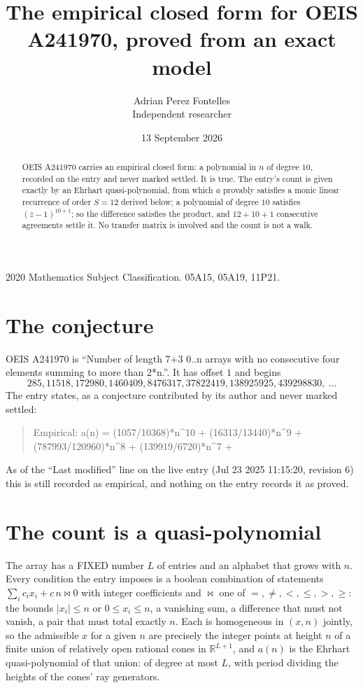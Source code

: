 \documentclass[11pt,a4paper]{article}
\title{The empirical closed form for OEIS A241970, proved from an exact model}
\author{Adrian Perez Fontelles\\ \small Independent researcher}
\date{13 September 2026}
\theoremstyle{plain}
\theoremstyle{definition}
\begin{document}
\maketitle

\begin{abstract}
OEIS A241970 carries an empirical closed form: a polynomial in $n$ of degree $10$, recorded on the
entry and never marked settled. It is true. The entry's count is given exactly by an Ehrhart
quasi-polynomial, from which $a$ provably satisfies a monic linear recurrence of order $S=12$
derived below; a polynomial of degree $10$ satisfies $(z-1)^{10+1}$; so the difference
satisfies the product, and $12+10+1$ consecutive agreements settle it. No transfer matrix is
involved and the count is not a walk.
\end{abstract}

\noindent\small 2020 Mathematics Subject Classification. 05A15, 05A19, 11P21.\normalsize

\section{The conjecture}

OEIS A241970 is ``Number of length 7+3 0..n arrays with no consecutive four elements summing to more than 2*n.''. It has offset $1$ and begins
\[
285, 11518, 172980, 1460409, 8476317, 37822419, 138925925, 439298830,\ \dots
\]
The entry states, as a conjecture contributed by its author and never marked settled:
\begin{quote}
Empirical: a(n) = (1057/10368)*n\^{}10 + (16313/13440)*n\^{}9 + (787993/120960)*n\^{}8 + (139919/6720)*n\^{}7 + 
\end{quote}
As of the ``Last modified'' line on the live entry (Jul 23 2025 11:15:20, revision 6)
this is still recorded as empirical, and nothing on the entry records it as proved.

\section{The count is a quasi-polynomial}

The array has a FIXED number $L$ of entries and an alphabet that grows with $n$. Every
condition the entry imposes is a boolean combination of statements
$\sum_i c_ix_i + c\,n \bowtie 0$ with integer coefficients and $\bowtie$ one of
$=,\ne,<,\le,>,\ge$: the bounds $|x_i|\le n$ or $0\le x_i\le n$, a vanishing sum, a difference
that must not vanish, a pair that must total exactly $n$. Each is homogeneous in $(x,n)$
jointly, so the admissible $x$ for a given $n$ are precisely the integer points at height $n$
of a finite union of relatively open rational cones in $\mathbb{R}^{L+1}$, and $a(n)$ is
the Ehrhart quasi-polynomial of that union: of degree at most $L$, with period dividing the
heights of the cones' ray generators.
\end{document}
